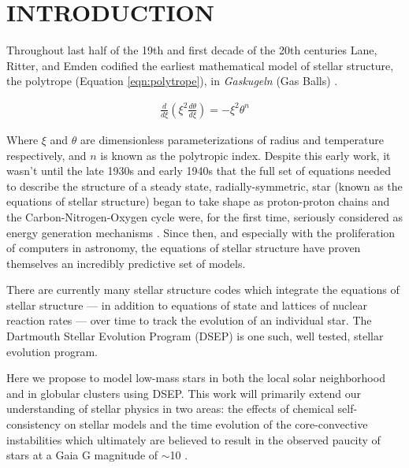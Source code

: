 \section{INTRODUCTION}
Throughout last half of the 19th and first decade of the 20th centuries Lane,
Ritter, and Emden codified the earliest mathematical model of stellar
structure, the polytrope (Equation \ref{eqn:polytrope}), in \textit{Gaskugeln}
(Gas Balls) \citep{Emden1907}.

\begin{align}\label{eqn:polytrope}
	\frac{d}{d\xi}\left(\xi^{2}\frac{d\theta}{d\xi}\right) = -\xi^{2}\theta^{n}
\end{align}

Where $\xi$ and $\theta$ are dimensionless parameterizations of radius and
temperature respectively, and $n$ is known as the polytropic index. Despite this
early work, it wasn't until the late 1930s and early 1940s that the full set of
equations needed to describe the structure of a steady state,
radially-symmetric, star (known as the equations of stellar structure) began to
take shape as proton-proton chains and the Carbon-Nitrogen-Oxygen cycle were,
for the first time, seriously considered as energy generation mechanisms
\citep{Cowling1966}. Since then, and especially with the proliferation of
computers in astronomy, the equations of stellar structure have proven
themselves an incredibly predictive set of models.  

There are currently many stellar structure codes \citep[e.g.][]{Dotter2008,
Kovetz2009, Paxton2011} which integrate the equations of stellar structure ---
in addition to equations of state and lattices of nuclear reaction rates ---
over time to track the evolution of an individual star. The Dartmouth Stellar
Evolution Program (DSEP) \citep{Chaboyer2001, Bjork2006, Dotter2008} is one
such, well tested, stellar evolution program.

Here we propose to model low-mass stars in both the local solar neighborhood
and in globular clusters using DSEP. This work will primarily extend our
understanding of stellar physics in two areas: the effects of chemical
self-consistency on stellar models \citep[e.g.][]{Dotter2015} and the time
evolution of the core-convective instabilities which ultimately are believed to
result in the observed paucity of stars at a Gaia G magnitude of $\sim$10
\citep{Jao2018, Feiden2021}. 


